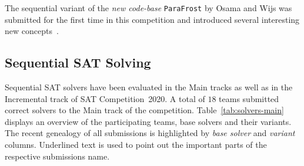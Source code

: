 \documentclass{elsarticle}
\newcommand{\solver}[1]{\texttt{#1}}
\begin{document}
The sequential variant of the \emph{new code-base} \solver{ParaFrost} by Osama and Wijs was submitted for the first time in this competition and introduced several interesting new concepts~\cite{Osama:SC2020:Parafrost}. 


\subsection{Sequential SAT Solving}
\label{sec:part:seq}

Sequential SAT solvers have been evaluated in the Main tracks as well as in the Incremental track of SAT Competition~2020. 
A total of $18$ teams submitted correct solvers to the Main track of the competition. 
Table~\ref{tab:solvers-main} displays an overview of the participating teams, base solvers and their variants. 
The recent genealogy of all submissions is highlighted by \emph{base solver} and \emph{variant} columns. 
Underlined text is used to point out the important parts of the respective submissions name.

\renewcommand{\solver}[1]{\underline{\texttt{#1}}}
\newcommand{\solbert}[1]{\texttt{#1}}
\end{document}
